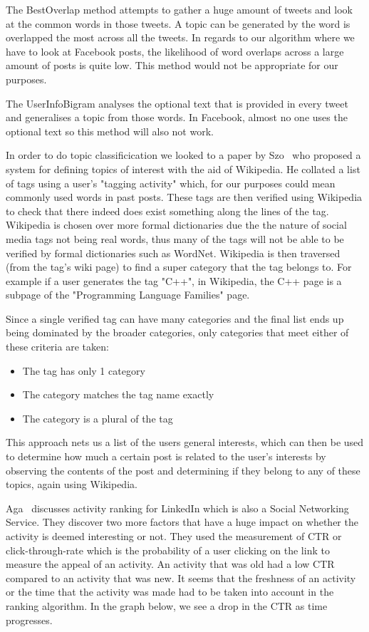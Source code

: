The BestOverlap method attempts to gather a huge amount of tweets and look at the common words in those tweets. A topic can be generated by the word is overlapped the most across all the tweets. In regards to our algorithm where we have to look at Facebook posts, the likelihood of word overlaps across a large amount of posts is quite low. This method would not be appropriate for our purposes.

The UserInfoBigram analyses the optional text that is provided in every tweet and generalises a topic from those words. In Facebook, almost no one uses the optional text so this method will also not work.

In order to do topic classificication we looked to a paper by Szo~\cite{szomszor2008semantic} who proposed a system for defining topics of interest with the aid of Wikipedia. He collated a list of tags using a user's "tagging activity" which, for our purposes could mean commonly used words in past posts. These tags are then verified using Wikipedia to check that there indeed does exist something along the lines of the tag. Wikipedia is chosen over more formal dictionaries due the the nature of social media tags not being real words, thus many of the tags will not be able to be verified by formal dictionaries such as WordNet. Wikipedia is then traversed (from the tag's wiki page) to find a super category that the tag belongs to. For example if a user generates the tag "C++", in Wikipedia, the C++ page is a subpage of the "Programming Language Families" page. 

Since a single verified tag can have many categories and the final list ends up being dominated by the broader categories, only categories that meet either of these criteria are taken:
\begin{itemize}
 \item The tag has only 1 category
 \item The category matches the tag name exactly
 \item The category is a plural of the tag
\end{itemize}

This approach nets us a list of the users general interests, which can then be used to determine how much a certain post is related to the user's interests by observing the contents of the post and determining if they belong to any of these topics, again using Wikipedia.

Aga~\cite{Aga2014} discusses activity ranking for LinkedIn which is also a Social Networking Service. They discover two more factors that have a huge impact on whether the activity is deemed interesting or not. They used the measurement of CTR or click-through-rate which is the probability of a user clicking on the link to measure the appeal of an activity. An activity that was old had a low CTR compared to an activity that was new. It seems that the freshness of an activity or the time that the activity was made had to be taken into account in the ranking algorithm.  In the graph below, we see a drop in the CTR as time progresses.


